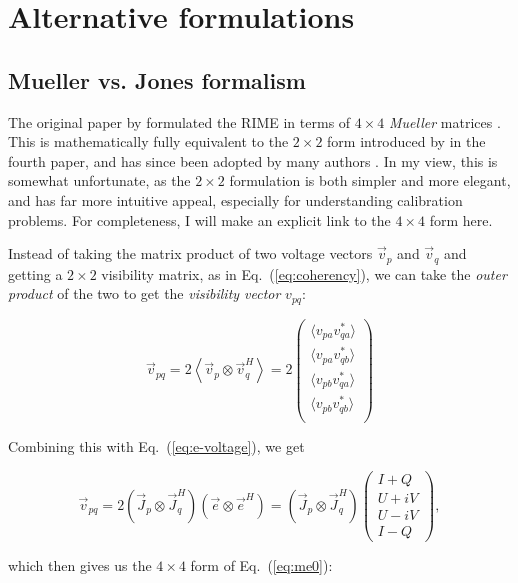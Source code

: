 \documentclass{aa}
\newcommand{\herm}{H}
\newcommand{\jones}[2]{\vec {#1}_{#2}}
\newcommand{\jonesT}[2]{\vec {#1}^{\herm}_{#2}}
\begin{document}
\section{\label{sec:formulations}Alternative formulations}

\subsection{Mueller vs. Jones formalism\label{sec:mueller}}

The original paper by \citet{ME1} formulated the RIME in terms of $4\times4$ {\em Mueller} matrices \citep{Muller}. This is mathematically fully equivalent to the $2\times2$ form introduced by \citet{ME4} in the fourth paper, and has since been adopted by many authors \citep{JEN:note185,tms,SB:imageplane,Rau:DDEs}. In my view, this is somewhat unfortunate, as the $2\times2$ formulation is both simpler and more elegant, and has far more intuitive appeal, especially for understanding calibration problems. For completeness, I will make an explicit link to the $4\times4$ form here.

Instead of taking the matrix product of two voltage vectors $\vec v_p$ and $\vec v_q$ and getting a $2\times2$ visibility matrix, as in Eq.~(\ref{eq:coherency}), we can take the {\em outer product} of the two to get the {\em visibility vector} $v_{pq}$:

\[
\vec v_{pq} = 2 \left< \vec v_p \otimes \vec v^\herm_q \right > = 2 \left ( 
\begin{array}{c}
    \langle v_{pa}v^*_{qa}\rangle \\ \langle v_{pa}v^*_{qb}\rangle \\
    \langle v_{pb}v^*_{qa}\rangle \\ \langle v_{pb}v^*_{qb}\rangle \\
\end{array} 
\right ) 
\]

Combining this with Eq.~(\ref{eq:e-voltage}), we get

\[
    \vec v_{pq} = 2 ( \jones{J}{p} \otimes \jonesT{J}{q} ) (\vec e \otimes \vec e^\herm )
 = ( \jones{J}{p} \otimes \jonesT{J}{q} ) 
\left ( \begin{array}{c}
I+Q \\ U+iV \\ U-iV \\ I-Q
\end{array} \right ), 
\]

which then gives us the $4\times4$ form of Eq.~(\ref{eq:me0}):
\end{document}
